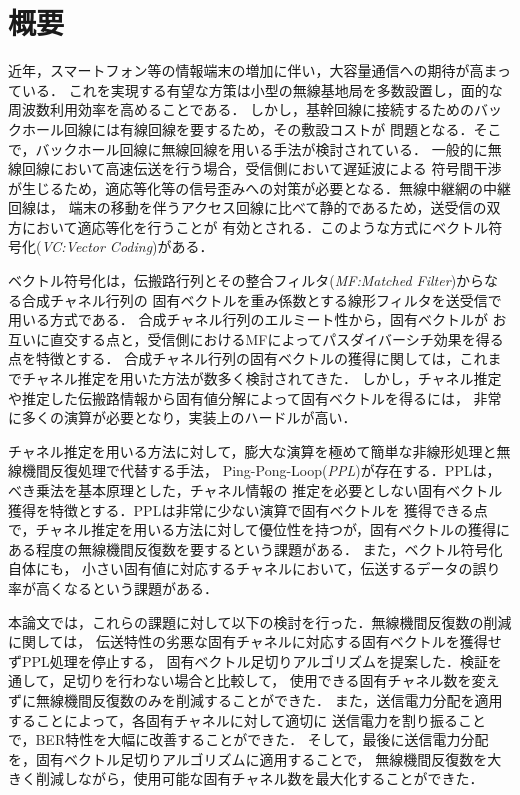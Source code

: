 \chapter*{概要} %

近年，スマートフォン等の情報端末の増加に伴い，大容量通信への期待が高まっている．
これを実現する有望な方策は小型の無線基地局を多数設置し，面的な周波数利用効率を高めることである．
しかし，基幹回線に接続するためのバックホール回線には有線回線を要するため，その敷設コストが
問題となる．そこで，バックホール回線に無線回線を用いる手法が検討されている．
一般的に無線回線において高速伝送を行う場合，受信側において遅延波による
符号間干渉が生じるため，適応等化等の信号歪みへの対策が必要となる．無線中継網の中継回線は，
端末の移動を伴うアクセス回線に比べて静的であるため，送受信の双方において適応等化を行うことが
有効とされる．このような方式にベクトル符号化(\emph{VC:Vector Coding})がある．

ベクトル符号化は，伝搬路行列とその整合フィルタ(\emph{MF:Matched Filter})からなる合成チャネル行列の
固有ベクトルを重み係数とする線形フィルタを送受信で用いる方式である．
合成チャネル行列のエルミート性から，固有ベクトルが
お互いに直交する点と，受信側におけるMFによってパスダイバーシチ効果を得る点を特徴とする．
合成チャネル行列の固有ベクトルの獲得に関しては，これまでチャネル推定を用いた方法が数多く検討されてきた．
しかし，チャネル推定や推定した伝搬路情報から固有値分解によって固有ベクトルを得るには，
非常に多くの演算が必要となり，実装上のハードルが高い．

チャネル推定を用いる方法に対して，膨大な演算を極めて簡単な非線形処理と無線機間反復処理で代替する手法，
Ping-Pong-Loop(\emph{PPL})が存在する．PPLは，べき乗法を基本原理とした，チャネル情報の
推定を必要としない固有ベクトル獲得を特徴とする．PPLは非常に少ない演算で固有ベクトルを
獲得できる点で，チャネル推定を用いる方法に対して優位性を持つが，固有ベクトルの獲得に
ある程度の無線機間反復数を要するという課題がある．
\thispagestyle{empty}
\clearpage
また，ベクトル符号化自体にも，
小さい固有値に対応するチャネルにおいて，伝送するデータの誤り率が高くなるという課題がある．

本論文では，これらの課題に対して以下の検討を行った．無線機間反復数の削減に関しては，
伝送特性の劣悪な固有チャネルに対応する固有ベクトルを獲得せずPPL処理を停止する，
固有ベクトル足切りアルゴリズムを提案した．検証を通して，足切りを行わない場合と比較して，
使用できる固有チャネル数を変えずに無線機間反復数のみを削減することができた．
また，送信電力分配を適用することによって，各固有チャネルに対して適切に
送信電力を割り振ることで，BER特性を大幅に改善することができた．
そして，最後に送信電力分配を，固有ベクトル足切りアルゴリズムに適用することで，
無線機間反復数を大きく削減しながら，使用可能な固有チャネル数を最大化することができた．
\thispagestyle{empty}
\clearpage
\addtocounter{page}{-2}